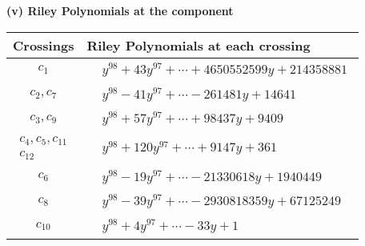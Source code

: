 \documentclass[1p]{elsarticle_modified}
\theoremstyle{definition}
\begin{document}
\newpage\renewcommand{\arraystretch}{1}
\flushleft \textbf{(v) Riley Polynomials at the component}\newline \\
\begin{tabular}{m{50pt}|m{274pt}}
Crossings & \hspace{64pt}Riley Polynomials at each crossing \\
\hline $$\begin{aligned}c_{1}\end{aligned}$$&$\begin{aligned}
&y^{98}+43 y^{97}+\cdots+4650552599 y+214358881
\end{aligned}$\\
\hline $$\begin{aligned}c_{2},c_{7}\end{aligned}$$&$\begin{aligned}
&y^{98}-41 y^{97}+\cdots-261481 y+14641
\end{aligned}$\\
\hline $$\begin{aligned}c_{3},c_{9}\end{aligned}$$&$\begin{aligned}
&y^{98}+57 y^{97}+\cdots+98437 y+9409
\end{aligned}$\\
\hline $$\begin{aligned}c_{4},c_{5},c_{11}\\c_{12}\end{aligned}$$&$\begin{aligned}
&y^{98}+120 y^{97}+\cdots+9147 y+361
\end{aligned}$\\
\hline $$\begin{aligned}c_{6}\end{aligned}$$&$\begin{aligned}
&y^{98}-19 y^{97}+\cdots-21330618 y+1940449
\end{aligned}$\\
\hline $$\begin{aligned}c_{8}\end{aligned}$$&$\begin{aligned}
&y^{98}-39 y^{97}+\cdots-2930818359 y+67125249
\end{aligned}$\\
\hline $$\begin{aligned}c_{10}\end{aligned}$$&$\begin{aligned}
&y^{98}+4 y^{97}+\cdots-33 y+1
\end{aligned}$\\
\hline
\end{tabular}\\~\\
\end{document}
